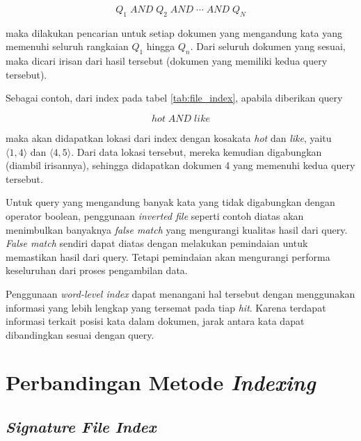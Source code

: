 \[
  Q_1 \;\textit{AND} \;Q_2 \;\textit{AND} \;\cdots{} \;\textit{AND} \;Q_N
\]

maka dilakukan pencarian untuk setiap dokumen yang mengandung kata yang memenuhi
seluruh rangkaian $Q_1$ hingga $Q_n$. Dari seluruh dokumen yang sesuai, maka
dicari irisan dari hasil tersebut (dokumen yang memiliki kedua query tersebut).

Sebagai contoh, dari index pada tabel \ref{tab:file_index}, apabila diberikan
query

\[
  hot\; \textit{AND} \;like
\]

maka akan didapatkan lokasi dari index dengan kosakata \textit{hot} dan
\textit{like}, yaitu $\langle{}1, 4 \rangle{}$ dan $\langle{}4, 5 \rangle{}$.
Dari data lokasi tersebut, mereka kemudian digabungkan (diambil irisannya),
sehingga didapatkan dokumen 4 yang memenuhi kedua query tersebut.

Untuk query yang mengandung banyak kata yang tidak digabungkan dengan operator
boolean, penggunaan \textit{inverted file} seperti contoh diatas akan
menimbulkan banyaknya \textit{false match} yang mengurangi kualitas hasil dari
query. \textit{False match} sendiri dapat diatas dengan melakukan pemindaian
untuk memastikan hasil dari query. Tetapi pemindaian akan mengurangi performa
keseluruhan dari proses pengambilan data.

Penggunaan \textit{word-level index} dapat menangani hal tersebut dengan
menggunakan informasi yang lebih lengkap yang tersemat pada tiap \textit{hit}.
Karena terdapat informasi terkait posisi kata dalam dokumen, jarak antara kata
dapat dibandingkan sesuai dengan query.

%

\section{Perbandingan Metode \emph{Indexing}}

\subsection{\emph{Signature File Index}}

